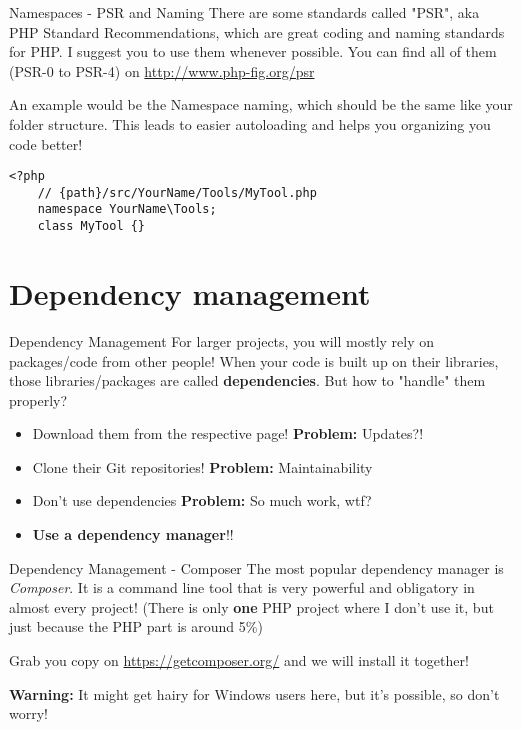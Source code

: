 \begin{frame}[fragile]{Namespaces - PSR and Naming}
	There are some standards called "PSR", aka PHP Standard Recommendations, which are great coding and naming standards for PHP. I suggest you to use them whenever possible. You can find all of them (PSR-0 to PSR-4) on \url{http://www.php-fig.org/psr} \pause
 	
	An example would be the Namespace naming, which should be the same like your folder structure.
	This leads to easier autoloading and helps you organizing you code better! \pause
	\begin{lstlisting}
<?php
	// {path}/src/YourName/Tools/MyTool.php
	namespace YourName\Tools;
	class MyTool {}
	\end{lstlisting}
	
\end{frame}

\section{Dependency management}

\begin{frame}[fragile]{Dependency Management}
	For larger projects, you will mostly rely on packages/code from other people! When your code is built up on their libraries, those libraries/packages are called \textbf{dependencies}.
	But how to "handle" them properly? \pause
	
	\begin{itemize}
		\item Download them from the respective page! \pause 
		\textbf{Problem:} Updates?! \pause
		\item Clone their Git repositories! \pause 
		\textbf{Problem:} Maintainability \pause
		\item Don't use dependencies \pause 
		\textbf{Problem:} So much work, wtf? \pause
		\item \textbf{Use a dependency manager}!!
	\end{itemize}
	
\end{frame}

\begin{frame}[fragile]{Dependency Management - Composer}
	The most popular dependency manager is \textit{Composer}. \pause 
	It is a command line tool that is very powerful and obligatory in almost every project! \pause (There is only \textbf{one} PHP project where I don't use it, but just because the PHP part is around 5\%)
	
	Grab you copy on \url{https://getcomposer.org/} and we will install it together! \pause
	
	\textbf{Warning:} It might get hairy for Windows users here, but it's possible, so don't worry!
	
\end{frame}




